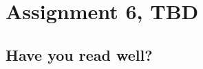 \documentclass[assignments]{subfiles}
\begin{document}
\section{Assignment 6, TBD}


\subsection{Have you read well?}
\end{document}
